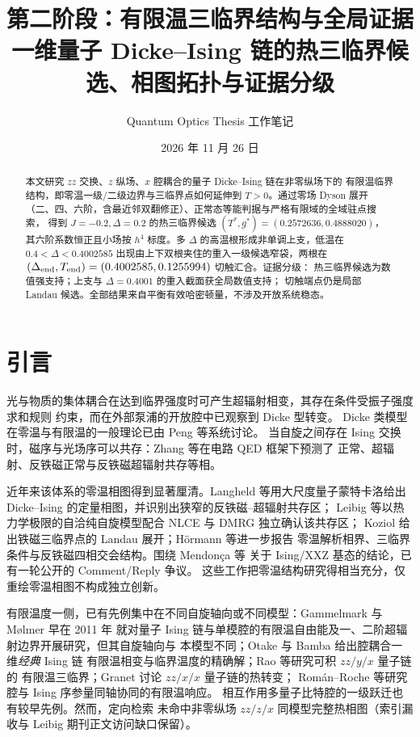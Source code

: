 \documentclass[UTF8,11pt,a4paper]{ctexart}
\title{第二阶段：有限温三临界结构与全局证据\\[0.4em]
\large 一维量子 Dicke--Ising 链的热三临界候选、相图拓扑与证据分级}
\author{Quantum Optics Thesis 工作笔记}
\date{2026 年 11 月 26 日}
\begin{document}
\maketitle

\begin{abstract}
本文研究 $zz$ 交换、$z$ 纵场、$x$ 腔耦合的量子 Dicke--Ising 链在非零纵场下的
有限温临界结构，即零温一级/二级边界与三临界点如何延伸到 $T>0$。通过零场 Dyson 展开
（二、四、六阶，含最近邻双翻修正）、正常态等能判据与严格有限域的全域驻点搜索，
得到 $J=-0.2,\Delta=0.2$ 的热三临界候选 $(T^\ast,g^\ast)=(0.2572636,0.4888020)$，
其六阶系数恒正且小场按 $h^4$ 标度。多 $\Delta$ 的高温根形成非单调上支，低温在
$0.4<\Delta<0.4002585$ 出现由上下双根夹住的重入一级候选窄袋，两根在
$(\Delta_{\rm end},T_{\rm end})=(0.4002585,0.1255994)$ 切触汇合。证据分级：
热三临界候选为数值强支持；上支与 $\Delta=0.4001$ 的重入截面获全局数值支持；
切触端点仍是局部 Landau 候选。全部结果来自平衡有效哈密顿量，不涉及开放系统稳态。
\end{abstract}

\section{引言}

光与物质的集体耦合在达到临界强度时可产生超辐射相变，其存在条件受振子强度求和规则
约束\cite{Nataf2010NoGo}，而在外部泵浦的开放腔中已观察到 Dicke 型转变\cite{Baumann2010OpenDicke}。
Dicke 类模型在零温与有限温的一般理论已由 Peng 等系统讨论\cite{Peng2019Unified}。
当自旋之间存在 Ising 交换时，磁序与光场序可以共存：Zhang 等在电路 QED 框架下预测了
正常、超辐射、反铁磁正常与反铁磁超辐射共存等相\cite{Zhang2014CircuitIsing}。

近年来该体系的零温相图得到显著厘清。Langheld 等用大尺度量子蒙特卡洛给出 Dicke--Ising
的定量相图，并识别出狭窄的反铁磁--超辐射共存区\cite{Langheld2025Wormhole}；
Leibig 等以热力学极限的自洽纯自旋模型配合 NLCE 与 DMRG 独立确认该共存区\cite{Leibig2026SelfConsistent}；
Koziol 给出铁磁三临界点的 Landau 展开\cite{Koziol2026Criticality}；Hörmann 等进一步报告
零温解析相界、三临界条件与反铁磁四相交会结构\cite{Hormann2026Folds}。围绕 Mendonça 等
关于 Ising/XXZ 基态的结论\cite{Mendonca2025Matter}，已有一轮公开的 Comment/Reply 争议\cite{Hormann2025Comment}。
这些工作把零温结构研究得相当充分，仅重绘零温相图不构成独立创新。

有限温度一侧，已有先例集中在不同自旋轴向或不同模型：Gammelmark 与 Mølmer 早在 2011 年
就对量子 Ising 链与单模腔的有限温自由能及一、二阶超辐射边界开展研究，但其自旋轴向与
本模型不同\cite{Gammelmark2011Thermal}；Otake 与 Bamba 给出腔耦合一维\emph{经典} Ising 链
有限温相变与临界温度的精确解\cite{Otake2026FiniteT}；Rao 等研究可积 $zz/y/x$ 量子链的
有限温三临界\cite{Rao2025Unilateral}；Granet 讨论 $zz/x/x$ 量子链的热转变\cite{Granet2023Exact}；
Román--Roche 等研究腔与 Ising 序参量同轴协同的有限温响应\cite{RomanRoche2021Photon}。
相互作用多量子比特腔的一级跃迁也有较早先例\cite{Lee2004FirstOrder}。然而，定向检索
未命中非零纵场 $zz/z/x$ 同模型完整热相图（索引漏收与 Leibig 期刊正文访问缺口保留）。
\end{document}
